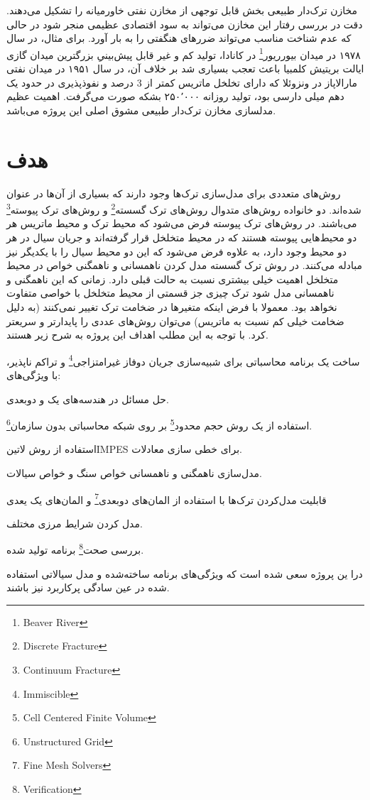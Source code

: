 مخازن ترک‌دار طبیعی بخش قابل توجهی از مخازن نفتی خاورمیانه را تشکیل می‌دهند\cite{sarma}. دقت در بررسی رفتار این مخازن می‌تواند به سود اقتصادی عظیمی منجر شود در حالی که عدم شناخت مناسب می‌تواند ضرر‌های هنگفتی را به بار آورد. برای مثال، در سال ۱۹۷۸ در میدان بیور‌ریور\footnote{Beaver River} در کانادا، تولید کم و غیر قابل پیش‌بینیِ بزرگترین میدان گازی ایالت بریتیش کلمبیا باعث تعجب بسیاری شد\cite{vangolf} بر خلاف آن، در سال ۱۹۵۱ در میدان نفتی مارالاپاز در ونزوئلا که دارای تخلخل ماتریس کمتر از 3 درصد و نفوذپذیری در حدود یک دهم میلی دارسی بود، تولید روزانه ۲۵۰٬۰۰۰ بشکه صورت می‌گرفت\cite{vangolf}. اهمیت عظیم مدلسازی مخازن ترک‌دار طبیعی مشوق اصلی این پروژه می‌باشد.

\section{هدف}
روش‌های متعددی برای مدل‌سازی ترک‌ها وجود دارند که بسیاری از آن‌ها در \cite{berkowitz} عنوان شده‌اند. دو خانواده روش‌های متدوال روش‌های ترک
گسسته\footnote{Discrete Fracture} و روش‌های ترک پیوسته\footnote{Continuum Fracture} می‌باشند. در روش‌های ترک پیوسته فرض می‌شود که محیط ترک و محیط ماتریس هر دو محیط‌هایی پیوسته هستند که در محیط متخلخل قرار گرفته‌اند و جریان سیال در هر دو محیط وجود دارد، به علاوه فرض می‌شود که این دو محیط سیال را با یکدیگر نیز مبادله می‌کنند. در روش ترک گسسته مدل کردن ناهمسانی و ناهمگنی خواص در محیط متخلخل اهمیت خیلی بیشتری نسبت به حالت قبلی دارد. زمانی که این ناهمگنی و ناهمسانی مدل شود ترک چیزی جز قسمتی از محیط متخلخل با خواصی متفاوت نخواهد بود. معمولا با فرض اینکه متغیر‌ها در ضخامت ترک تغییر نمی‌کنند (به دلیل ضخامت خیلی کم نسبت به ماتریس) می‌توان روش‌های عددی را پایدار‌تر و سریعتر کرد. با توجه به این مطلب اهداف این پروژه به شرح زیر هستند.
\begin{tight_enumerate}
\item ساخت یک برنامه محاسباتی برای شبیه‌سازی جریان دوفاز غیرامتزاجی\footnote{Immiscible} و تراکم ناپذیر، با ویژگی‌های:
	\begin{tight_itemize}
	\item حل مسائل در هندسه‌های یک و دو‌بعدی.
	\item استفاده از یک روش حجم محدود\footnote{Cell Centered Finite Volume} بر روی شبکه محاسباتی بدون سازمان\footnote{Unstructured Grid}.
	\item استفاده از روش \text‌لاتین{IMPES} برای خطی سازی معادلات.
	\item مدل‌سازی ناهمگنی و ناهمسانی خواص سنگ و خواص سیالات.
	\item قابلیت مدل‌کردن ترک‌ها با استفاده از المان‌های دوبعدی\footnote{Fine Mesh Solvers} و المان‌های یک یعدی
	\item مدل کردن شرایط مرزی مختلف.
	\end{tight_itemize}
\item بررسی صحت\footnote{Verification} برنامه تولید شده.
\end{tight_enumerate}
درا ین پروژه سعی شده است که ويژگی‌های برنامه ساخته‌شده و مدل سیالاتی استفاده شده در عین سادگی پرکاربرد نیز باشند.

